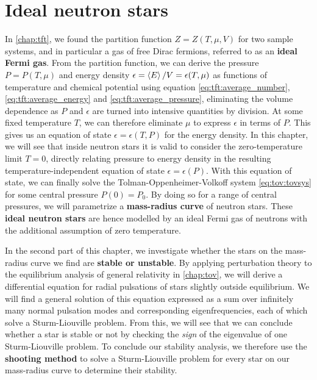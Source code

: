 \chapter{Ideal neutron stars}
\label{chap:nstars}



In \cref{chap:tft}, we found the partition function $Z = Z(T, \mu, V)$ for two sample systems, and in particular a gas of free Dirac fermions, referred to as an \textbf{ideal Fermi gas}.
From the partition function, we can derive the pressure $P = P(T, \mu)$ and energy density $\epsilon = \left< E \right>/V = \epsilon(T, \mu)$ as functions of temperature and chemical potential using equation \eqref{eq:tft:average_number}, \eqref{eq:tft:average_energy} and \eqref{eq:tft:average_pressure}, eliminating the volume dependence as $P$ and $\epsilon$ are turned into intensive quantities by division.
At some fixed temperature $T$, we can therefore eliminate $\mu$ to express $\epsilon$ in terms of $P$.
This gives us an equation of state $\epsilon = \epsilon(T, P)$ for the energy density.
In this chapter, we will see that inside neutron stars it is valid to consider the zero-temperature limit $T=0$, directly relating pressure to energy density in the resulting temperature-independent equation of state $\epsilon = \epsilon(P)$.
With this equation of state, we can finally solve the Tolman-Oppenheimer-Volkoff system \eqref{eq:tov:tovsys} for some central pressure $P(0)=P_0$.
By doing so for a range of central pressures, we will parametrize a \textbf{mass-radius curve} of neutron stars.
These \textbf{ideal neutron stars} are hence modelled by an ideal Fermi gas of neutrons with the additional assumption of zero temperature.

In the second part of this chapter, we investigate whether the stars on the mass-radius curve we find are \textbf{stable or unstable}.
By applying perturbation theory to the equilibrium analysis of general relativity in \cref{chap:tov}, we will derive a differential equation for radial pulsations of stars slightly outside equilibrium.
We will find a general solution of this equation expressed as a sum over infinitely many normal pulsation modes and corresponding eigenfrequencies, each of which solve a Sturm-Liouville problem.
From this, we will see that we can conclude whether a star is stable or not by checking the \emph{sign} of the eigenvalue of one Sturm-Liouville problem.
To conclude our stability analysis, we therefore use the \textbf{shooting method} to solve a Sturm-Liouville problem for every star on our mass-radius curve to determine their stability.

